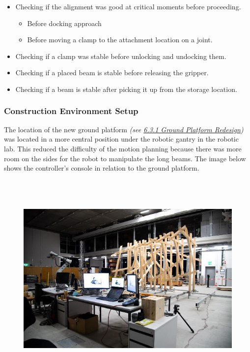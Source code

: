 \documentclass[11pt]{book}
\begin{document}
\begin{itemize}
	\item Checking if the alignment was good at critical moments before proceeding.

\begin{itemize}
	\item Before docking approach

	\item Before moving a clamp to the attachment location on a joint.

\end{itemize}
	\item Checking if a clamp was stable before unlocking and undocking them.

	\item Checking if a placed beam is stable before releasing the gripper.

	\item Checking if a beam is stable after picking it up from the storage location.

\end{itemize}
\subsubsection{Construction Environment Setup}

The location of the new ground platform \textit{\textcolor[HTML]{B7B7B7}{(see \uline{6.3.1 Ground Platform Redesign})}} was located in a more central position under the robotic gantry in the robotic lab. This reduced the difficulty of the motion planning because there was more room on the sides for the robot to manipulate the long beams. The image below shows the controller’s console in relation to the ground platform.

\begin{figure}[H]
\includegraphics[width=15.92cm,height=10.62cm]{./images/image67.jpeg}
\end{figure}
\end{document}
